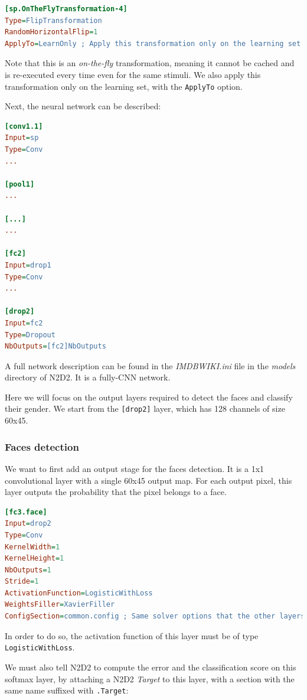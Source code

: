 \documentclass[a4paper,11pt,oneside]{article}
\begin{document}
\begin{lstlisting}[language=ini]
[sp.OnTheFlyTransformation-4]
Type=FlipTransformation
RandomHorizontalFlip=1
ApplyTo=LearnOnly ; Apply this transformation only on the learning set
\end{lstlisting}

Note that this is an \emph{on-the-fly} transformation, meaning it cannot be
cached and is re-executed every time even for the same stimuli.
We also apply this transformation only on the learning set, with the
\lstinline!ApplyTo! option.

Next, the neural network can be described:
\begin{lstlisting}[language=ini]
[conv1.1]
Input=sp
Type=Conv
...

[pool1]
...

[...]
...

[fc2]
Input=drop1
Type=Conv
...

[drop2]
Input=fc2
Type=Dropout
NbOutputs=[fc2]NbOutputs
\end{lstlisting}

A full network description can be found in the \emph{IMDBWIKI.ini} file in the
\emph{models} directory of N2D2. It is a fully-CNN network.

Here we will focus on the output layers required to detect the faces and
classify their gender. We start from the \lstinline![drop2]! layer, which has
128 channels of size 60x45.

\subsubsection{Faces detection}

We want to first add an output stage for the faces detection. It is a 1x1
convolutional layer with a single 60x45 output map. For each output pixel, this
layer outputs the probability that the pixel belongs to a face.

\begin{lstlisting}[language=ini]
[fc3.face]
Input=drop2
Type=Conv
KernelWidth=1
KernelHeight=1
NbOutputs=1
Stride=1
ActivationFunction=LogisticWithLoss
WeightsFiller=XavierFiller
ConfigSection=common.config ; Same solver options that the other layers
\end{lstlisting}

In order to do so, the activation function of this layer must be of type
\lstinline!LogisticWithLoss!.

We must also tell N2D2 to compute the error and the classification score on this
softmax layer, by attaching a N2D2 \emph{Target} to this layer, with a
section with the same name suffixed with \lstinline!.Target!:
\end{document}
